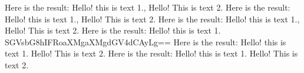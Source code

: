 Here is the result: Hello! this is text 1., Hello! This is text 2. Here is the result: Hello! this is text 1., Hello! This is text 2. Here is the result: Hello! this is text 1., Hello! This is text 2. Here is the result: Hello! this is text 1. SGVsbG8hIFRoaXMgaXMgdGV4dCAyLg== Here is the result: Hello! this is text 1. Hello! This is text 2. Here is the result: Hello! this is text 1. Hello! This is text 2. 
